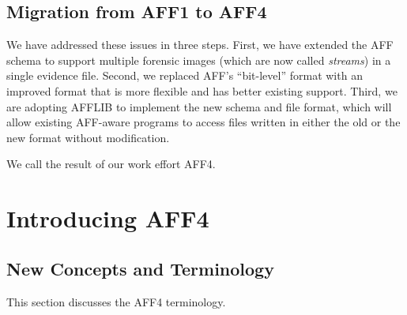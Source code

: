 \documentclass[10pt, conference]{IEEEtran}
\begin{document}
\subsection{Migration from AFF1 to AFF4}

We have addressed these issues in three steps. First, we have extended
the AFF schema to support multiple forensic images (which are now
called \emph{streams}) in a single evidence file. Second, we replaced
AFF's ``bit-level'' format with an improved format that is more
flexible and has better existing support. Third, we are adopting
AFFLIB to implement the new schema and file format, which will allow
existing AFF-aware programs to access files written in either the old
or the new format without modification.

We call the result of our work effort AFF4.

\section{Introducing AFF4}

\subsection{New Concepts and Terminology}

This section discusses the AFF4 terminology. 

\end{document}
